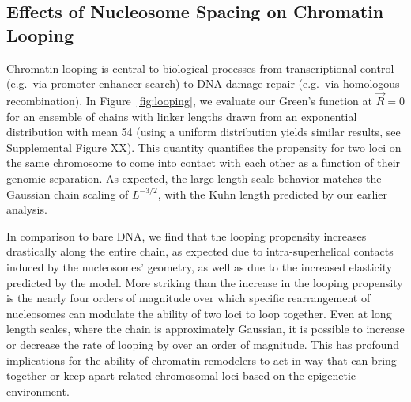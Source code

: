 \documentclass[%
 reprint,
superscriptaddress,
showpacs,preprintnumbers,
 amsmath,amssymb,
 aps,
 prl,
]{revtex4-1}
\begin{document}
\subsection{\label{sec:looping}Effects of Nucleosome Spacing on Chromatin
Looping}

Chromatin looping is central to biological processes from transcriptional
    control (e.g.\ via promoter-enhancer search) to DNA damage repair (e.g.\ via
    homologous recombination).
In Figure~\ref{fig:looping}, we evaluate our Green's function at $\vec{R} = 0$
    for an ensemble of chains with linker lengths drawn from an exponential
    distribution with mean \SI{54}{\basepair} (using a uniform distribution
    yields similar results, see Supplemental Figure XX).
This quantity quantifies the propensity for two loci on the same chromosome to
    come into contact with each other as a function of their genomic separation.
As expected, the large length scale behavior matches the Gaussian chain scaling
    of $L^{-3/2}$, with the Kuhn length predicted by our earlier analysis.

In comparison to bare DNA, we find that the looping propensity increases
    drastically along the entire chain, as expected due to intra-superhelical
    contacts induced by the nucleosomes' geometry, as well as due to the
    increased elasticity predicted by the model.
More striking than the increase in the looping propensity is the nearly four
    orders of magnitude over which specific rearrangement of nucleosomes can
    modulate the ability of two loci to loop together.
Even at long length scales, where the chain is approximately Gaussian, it is
    possible to increase or decrease the rate of looping by over an order of
    magnitude.
This has profound implications for the ability of chromatin remodelers to act in
    way that can bring together or keep apart related chromosomal loci based on
    the epigenetic environment.
\end{document}
